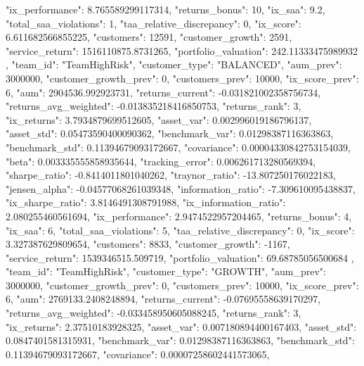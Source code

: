 {{            "ix_performance": 8.765589299117314,
            "returns_bonus": 10,
            "ix_saa": 9.2,
            "total_saa_violations": 1,
            "taa_relative_discrepancy": 0,
            "ix_score": 6.611682566855225,
            "customers": 12591,
            "customer_growth": 2591,
            "service_return": 1516110875.8731265,
            "portfolio_valuation": 242.11333475989932
        },
        {
            "team_id": "TeamHighRisk",
            "customer_type": "BALANCED",
            "aum_prev": 3000000,
            "customer_growth_prev": 0,
            "customers_prev": 10000,
            "ix_score_prev": 6,
            "aum": 2904536.992923731,
            "returns_current": -0.031821002358756734,
            "returns_avg_weighted": -0.013835218416850753,
            "returns_rank": 3,
            "ix_returns": 3.7934879699512605,
            "asset_var": 0.002996019186796137,
            "asset_std": 0.05473590400090362,
            "benchmark_var": 0.01298387116363863,
            "benchmark_std": 0.11394679093172667,
            "covariance": 0.00004330842753154039,
            "beta": 0.003335555858935644,
            "tracking_error": 0.006261713280569394,
            "sharpe_ratio": -0.8414011801040262,
            "traynor_ratio": -13.807250176022183,
            "jensen_alpha": -0.04577068261039348,
            "information_ratio": -7.309610095438837,
            "ix_sharpe_ratio": 3.8146491308791988,
            "ix_information_ratio": 2.080255460561694,
            "ix_performance": 2.9474522957204465,
            "returns_bonus": 4,
            "ix_saa": 6,
            "total_saa_violations": 5,
            "taa_relative_discrepancy": 0,
            "ix_score": 3.327387629809654,
            "customers": 8833,
            "customer_growth": -1167,
            "service_return": 1539346515.509719,
            "portfolio_valuation": 69.68785056500684
        },
        {
            "team_id": "TeamHighRisk",
            "customer_type": "GROWTH",
            "aum_prev": 3000000,
            "customer_growth_prev": 0,
            "customers_prev": 10000,
            "ix_score_prev": 6,
            "aum": 2769133.2408248894,
            "returns_current": -0.07695558639170297,
            "returns_avg_weighted": -0.033458950605088245,
            "returns_rank": 3,
            "ix_returns": 2.37510183928325,
            "asset_var": 0.007180894400167403,
            "asset_std": 0.0847401581315931,
            "benchmark_var": 0.01298387116363863,
            "benchmark_std": 0.11394679093172667,
            "covariance": 0.00007258602441573065,
}}
